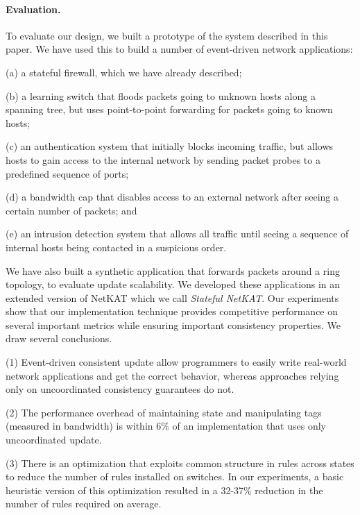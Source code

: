 \documentclass[pldi-cameraready]{sigplanconf}
\begin{document}
\paragraph*{Evaluation.}

To evaluate our design, we built a prototype of the system
described in this paper.
We have
used this to build a number of event-driven
network applications:
\begin{inparaenum}
\item[(a)] a stateful firewall, which we have already described; 
\item[(b)] a learning switch that floods packets going to unknown
  hosts along a spanning tree, but uses point-to-point forwarding for
  packets going to known hosts; 
\item[(c)] an authentication system that initially blocks incoming traffic, but
  allows hosts to gain access to the internal network by sending
  packet probes to a predefined sequence of ports;
\item[(d)] a bandwidth cap that disables access to an external
  network after seeing a certain number of packets; and
\item[(e)] an intrusion detection system that allows all traffic until
  seeing a sequence of internal hosts being contacted in a suspicious
  order.
\end{inparaenum}
We have also built a synthetic application that forwards
packets around a ring topology, to evaluate update scalability. We developed
these applications in an extended version of NetKAT which we call {\em Stateful NetKAT}.
Our experiments show that our implementation technique
provides competitive performance on several important metrics while
ensuring important consistency properties. We draw several conclusions.
\begin{inparaenum}
\item[(1)] Event-driven consistent update allow programmers to easily
write real-world network applications and get the correct behavior,
whereas approaches relying only on uncoordinated consistency
guarantees do not.
\item[(2)] The
performance overhead of maintaining state and manipulating tags
(measured in bandwidth) is within 6\% of an implementation
that uses only uncoordinated update.
\item[(3)] There is an
optimization that exploits common structure in rules across 
states to reduce the number of rules installed on
switches.
In our experiments, a basic heuristic version of this
optimization resulted in a 32-37\% reduction in the number of rules
required on average.
\end{inparaenum}
\end{document}
